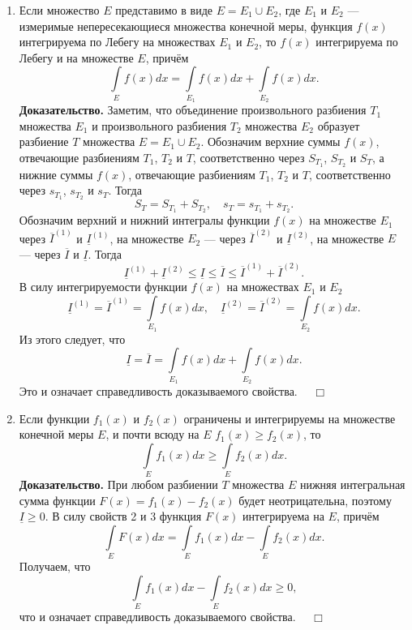 \documentclass[12pt,a4paper, titlepage]{article}
\begin{document}
\begin{enumerate}
\item Если множество $E$ представимо в виде $E = E_1 \cup E_2$, где $E_1$ и $E_2$ --- измеримые непересекающиеся множества конечной меры, функция $f(x)$ интегрируема по Лебегу на множествах $E_1$ и $E_2$, то $f(x)$ интегрируема по Лебегу и на множестве $E$, причём
$$
\int\limits_E f(x) dx = \int\limits_{E_1} f(x) dx + \int\limits_{E_2} f(x) dx.
$$
\textbf{Доказательство.} Заметим, что объединение произвольного разбиения $T_1$ множества $E_1$ и произвольного разбиения $T_2$ множества $E_2$ образует разбиение $T$ множества $E = E_1 \cup E_2$. Обозначим верхние суммы $f(x)$, отвечающие разбиениям $T_1$, $T_2$ и $T$, соответственно через $S_{T_1}$, $S_{T_2}$ и $S_T$, а нижние суммы $f(x)$, отвечающие разбиениям $T_1$, $T_2$ и $T$, соответственно через $s_{T_1}$, $s_{T_2}$ и $s_T$. Тогда
$$
S_T = S_{T_1} + S_{T_2}, \quad s_T = s_{T_1} + s_{T_2}.
$$
Обозначим верхний и нижний интегралы функции $f(x)$ на множестве $E_1$ через $\overline{I}^{(1)}$ и $\underline{I}^{(1)}$, на множестве $E_2$ --- через $\overline{I}^{(2)}$ и $\underline{I}^{(2)}$, на множестве $E$ --- через $\overline{I}$ и $\underline{I}$. Тогда
$$
\underline{I}^{(1)} + \underline{I}^{(2)} \leqslant \underline{I} \leqslant \overline{I} \leqslant \overline{I}^{(1)} + \overline{I}^{(2)}.
$$
В силу интегрируемости функции $f(x)$ на множествах $E_1$ и $E_2$
$$
\underline{I}^{(1)} = \overline{I}^{(1)} = \int\limits_{E_1} f(x) dx, \quad \underline{I}^{(2)} = \overline{I}^{(2)} = \int\limits_{E_2} f(x) dx.
$$
Из этого следует, что
$$
\underline{I} = \overline{I} = \int\limits_{E_1} f(x) dx + \int\limits_{E_2} f(x) dx.
$$
Это и означает справедливость доказываемого свойства. $\quad \Box$\\

\item
Если функции $f_1(x)$ и $f_2(x)$ ограничены и интегрируемы на множестве конечной меры $E$, и почти всюду на $E$ $f_1(x) \geqslant f_2(x)$, то
$$
\int\limits_E f_1(x) dx \geqslant \int\limits_E f_2(x) dx.
$$
\textbf{Доказательство.} При любом разбиении $T$ множества $E$ нижняя интегральная сумма функции $F(x) = f_1(x) - f_2(x)$ будет неотрицательна, поэтому $\underline{I} \geqslant 0$. В силу свойств 2 и 3 функция $F(x)$ интегрируема на $E$, причём
$$
\int\limits_E F(x) dx = \int\limits_E f_1(x) dx - \int\limits_E f_2(x) dx.
$$
Получаем, что
$$
\int\limits_E f_1(x) dx - \int\limits_E f_2(x) dx \geqslant 0,
$$
что и означает справедливость доказываемого свойства. $\quad \Box$\\
\end{enumerate}
\end{document}
